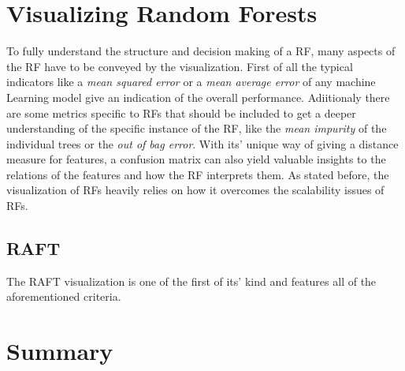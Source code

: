 \documentclass[a4paper, 12pt]{article}
\begin{document}
\section{Visualizing Random Forests}
To fully understand the structure and decision making of a RF, many aspects of the RF have to
be conveyed by the visualization. First of all the typical indicators like a 
\textit{mean squared error} or a \textit{mean average error} of any machine Learning model
give an indication of the overall performance. Adiitionaly there are some metrics specific
to RFs that should be included to get a deeper understanding of the specific instance of the
RF, like the \textit{mean impurity} of the individual trees or the 
\textit{out of bag error}. With its' unique way of giving a distance measure for features,
a confusion matrix can also yield valuable insights to the relations of the features and how
the RF interprets them. As stated before, the visualization of RFs heavily relies on how it
overcomes the scalability issues of RFs.

\subsection{RAFT}
The RAFT visualization is one of the first of its' kind and features all of the
aforementioned criteria. 


\section{Summary}
\cite{zhao2018iforest}

\clearpage


\end{document}
